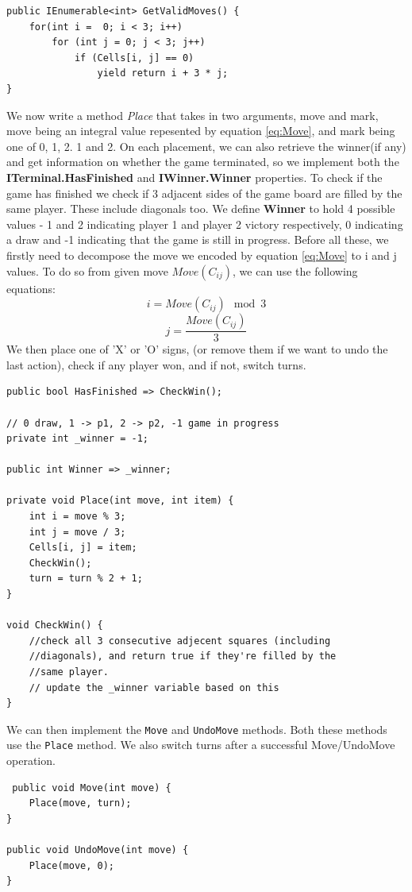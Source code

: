 \begin{lstlisting}
public IEnumerable<int> GetValidMoves() {
    for(int i =  0; i < 3; i++)
        for (int j = 0; j < 3; j++)
            if (Cells[i, j] == 0)
                yield return i + 3 * j;
}
\end{lstlisting}

We now write a method \textit{Place} that takes in two arguments, move and mark, move being an integral value repesented by equation \ref{eq:Move}, and mark being one of 0, 1, 2. 1 and 2.
On each placement, we can also retrieve the winner(if any) and get information on whether the game terminated, so we implement both the \textbf{ITerminal.HasFinished} and \textbf{IWinner.Winner} properties. To check if the game has finished we check if 3 adjacent sides of the game board are filled by the same player. These include diagonals too.
We define \textbf{Winner} to hold 4 possible values - 1 and 2 indicating player 1 and player 2 victory respectively, 0 indicating a draw and -1 indicating that the game is still in progress.
Before all these, we firstly need to decompose the move we encoded by equation \ref{eq:Move} to i and j values. To do so from given move $Move(C_{ij})$, we can use the following equations:
\begin{equation}
    i = Move(C_{ij}) \mod 3
\end{equation}
\begin{equation}
    j = \frac{Move(C_{ij})}{3}
\end{equation}
We then place one of 'X' or 'O' signs, (or remove them if we want to undo the last action), check if any player won, and if not, switch turns.

\begin{lstlisting}
public bool HasFinished => CheckWin();

// 0 draw, 1 -> p1, 2 -> p2, -1 game in progress
private int _winner = -1; 

public int Winner => _winner;

private void Place(int move, int item) {
    int i = move % 3;
    int j = move / 3;
    Cells[i, j] = item;
    CheckWin();
    turn = turn % 2 + 1;
}

void CheckWin() {
    //check all 3 consecutive adjecent squares (including
    //diagonals), and return true if they're filled by the
    //same player.
    // update the _winner variable based on this
}

\end{lstlisting}

We can then implement the \texttt{Move} and \texttt{UndoMove} methods. Both these methods use the \texttt{Place} method.
We also switch turns after a successful Move/UndoMove operation.
\begin{lstlisting}
 public void Move(int move) {
    Place(move, turn);
}

public void UndoMove(int move) {
    Place(move, 0);
}
\end{lstlisting}

